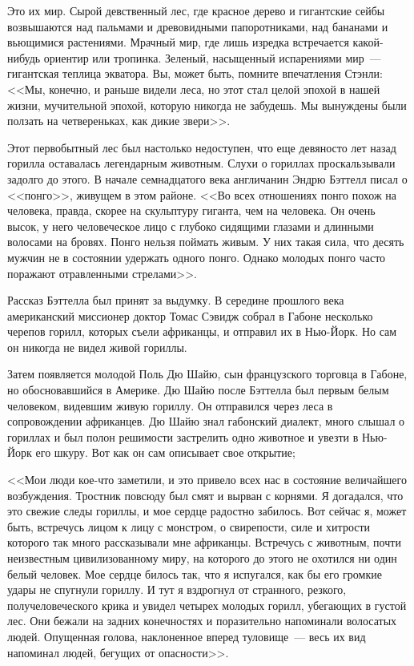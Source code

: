 \documentclass[12pt,a4paper,twoside,openany,svgnames]{memoir}
\begin{document}
Это их мир. Сырой девственный лес, где красное дерево и гигантские сейбы возвышаются над пальмами и древовидными папоротниками, над бананами и вьющимися растениями. Мрачный мир, где лишь изредка встречается какой-нибудь ориентир или тропинка. Зеленый, насыщенный испарениями мир~--- гигантская теплица экватора. Вы, может быть, помните впечатления Стэнли: <<Мы, конечно, и раньше видели леса, но этот стал целой эпохой в нашей жизни, мучительной эпохой, которую никогда не забудешь. Мы вынуждены были ползать на четвереньках, как дикие звери>>.

Этот первобытный лес был настолько недоступен, что еще девяносто лет назад горилла оставалась легендарным животным. Слухи о гориллах проскальзывали задолго до этого. В начале семнадцатого века англичанин Эндрю Бэттелл писал о <<понго>>, живущем в этом районе. <<Во всех отношениях понго похож на человека, правда, скорее на скульптуру гиганта, чем на человека. Он очень высок, у него человеческое лицо с глубоко сидящими глазами и длинными волосами на бровях. Понго нельзя поймать живым. У них такая сила, что десять мужчин не в состоянии удержать одного понго. Однако молодых понго часто поражают отравленными стрелами>>.

Рассказ Бэттелла был принят за выдумку. В середине прошлого века американский миссионер доктор Томас Сэвидж собрал в Габоне несколько черепов горилл, которых съели африканцы, и отправил их в Нью-Йорк. Но сам он никогда не видел живой гориллы.

Затем появляется молодой Поль Дю Шайю, сын французского торговца в Габоне, но обосновавшийся в Америке. Дю Шайю после Бэттелла был первым белым человеком, видевшим живую гориллу. Он отправился через леса в сопровождении африканцев. Дю Шайю знал габонский диалект, много слышал о гориллах и был полон решимости застрелить одно животное и увезти в Нью-Йорк его шкуру. Вот как он сам описывает свое открытие;

<<Мои люди кое-что заметили, и это привело всех нас в состояние величайшего возбуждения. Тростник повсюду был смят и вырван с корнями. Я догадался, что это свежие следы гориллы, и мое сердце радостно забилось. Вот сейчас я, может быть, встречусь лицом к лицу с монстром, о свирепости, силе и хитрости которого так много рассказывали мне африканцы. Встречусь с животным, почти неизвестным цивилизованному миру, на которого до этого не охотился ни один белый человек. Мое сердце билось так, что я испугался, как бы его громкие удары не спугнули гориллу. И тут я вздрогнул от странного, резкого, получеловеческого крика и увидел четырех молодых горилл, убегающих в густой лес. Они бежали на задних конечностях и поразительно напоминали волосатых людей. Опущенная голова, наклоненное вперед туловище~--- весь их вид напоминал людей, бегущих от опасности>>.
\end{document}
